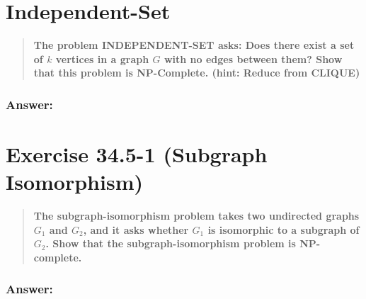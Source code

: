 \documentclass[titlepage]{article}\usepackage[]{graphicx}\usepackage[]{color}
\begin{document}
  \vspace{9cm}

\section{Independent-Set}
  \begin{quote}
  \textbf{The problem INDEPENDENT-SET asks: Does there exist a set of $k$
  vertices in a graph $G$ with no edges between them? Show that this problem is
  NP-Complete. (hint: Reduce from CLIQUE)}
  \end{quote}
  \subsubsection{Answer:}

  \vspace{9cm}








\section{Exercise 34.5-1 (Subgraph Isomorphism)}
  \begin{quote}
    \textbf{The subgraph-isomorphism problem takes two undirected graphs $G_1$ and
    $G_2$, and it asks whether $G_1$ is isomorphic to a subgraph of $G_2$. Show that the
    subgraph-isomorphism problem is NP-complete.}
  \end{quote}

  \subsubsection{Answer:}
  \vspace{9cm}
\end{document}
